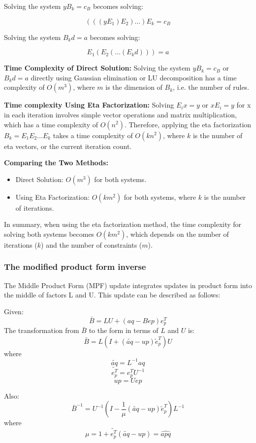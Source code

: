 Solving the system \(yB_k = c_B\) becomes solving:

\[
    (((yE_1)E_2) \ldots )E_{k} = c_B
\]

Solving the system \(B_kd = a\) becomes solving:

\[
    E_1(E_2( \ldots (E_{k}d))) = a
\]

\textbf{Time Complexity of Direct Solution:}
Solving the system \(yB_k = c_B\) or \(B_kd = a\)  directly using
Gaussian elimination or LU decomposition has a time complexity of \(O(m^3)\),
where \(m\) is the dimension of $B_k$, i.e. the number of rules.


\textbf{Time complexity Using Eta Factorization:}
Solving \(E_i x = y\) or  \(xE_i = y\) for x in each iteration involves
simple vector operations and matrix multiplication,
which has a time complexity of \(O(n^2)\).
Therefore, applying the eta factorization \(B_k = E_1E_2 \ldots E_k\)
takes a time complexity of \(O(kn^2)\), where $k$ is the number of eta vectors,
or the current iteration count.


\textbf{Comparing the Two Methods:}
\begin{itemize}
    \item Direct Solution: \(O(m^3)\) for both systems.
    \item Using Eta Factorization: \(O(km^2)\) for both systems,
          where \(k\) is the number of iterations.
\end{itemize}

In summary, when using the eta factorization method,
the time complexity for solving both systems becomes \(O(km^2)\),
which depends on the number of iterations (\(k\)) and the number of
constraints (\(m\)).


\subsubsection{The modified product form inverse}
The Middle Product Form (MPF) update integrates
updates in product form into the middle of factors L and U.
This update
can be described as follows:

Given:
\[ \bar{B} = LU + (aq - Bep)e^T_p \]
The transformation from \(\bar{B}\) to the form in terms of \(L\) and \(U\) is:
\[ \bar{B} = L(I + (\tilde{aq} - up)\tilde{e}^T_p )U \]
where
\[ \tilde{aq} = L^{-1}aq \]
\[ \tilde{e^T_p} = e^T_p U^{-1} \]
\[ up = Uep \]

Also:
\[ \bar{B}^{-1} = U^{-1}(I - \frac{1}{\mu} (\tilde{aq} - up)\tilde{e}^T_p )L^{-1} \]
where
\[ \mu = 1 + \tilde{e^T_p}(\tilde{aq} - up) = \hat{apq} \]

